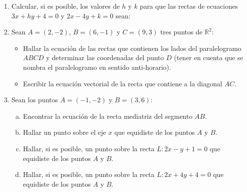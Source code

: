 \documentclass[11pt]{article}
\begin{document}
\begin{enumerate}[\hspace{-7mm}$1)$]
 
 
 
 
 
 
 
 
 
\item Calcular, si es posible, los valores de $h$ y $k$ para que las rectas de ecuaciones $3x + hy + 4 = 0$ y $2x - 4y + k = 0$ sean:

\begin{enumerate}[(a)]
\end{enumerate}











\item Sean $A = (2,-2)$, $B = (6,-1)$ y $C = (9,3)$ tres puntos de $\mathbb{R}^2$:

\begin{itemize}
    \item[(a)] Hallar la ecuación de las rectas que contienen los lados del paralelogramo $ABCD$ y determinar las coordenadas del punto $D$ (tener en cuenta que se nombra el paralelogramo en sentido anti-horario).
    \item[(b)] Escribir la ecuación vectorial de la recta que contiene a la diagonal $AC$.
\end{itemize}














\item Sean los puntos $A = (-1,-2)$ y $B = (3,6)$:


\begin{enumerate}[(a)]
    \item Encontrar la ecuación de la recta mediatriz del segmento $AB$.
    \item  Hallar un punto sobre el eje $x$ que equidiste de los puntos $A$ y $B$.
    \item  Hallar, si es posible, un punto sobre la recta $L : 2x - y + 1 = 0$ que equidiste de los puntos $A$ y $B$.
    \item Hallar, si es posible, un punto sobre la recta $L : 2x + 4y + 4 = 0$ que equidiste de los puntos $A$ y $B$.
\end{enumerate}








\end{enumerate}
\end{document}
